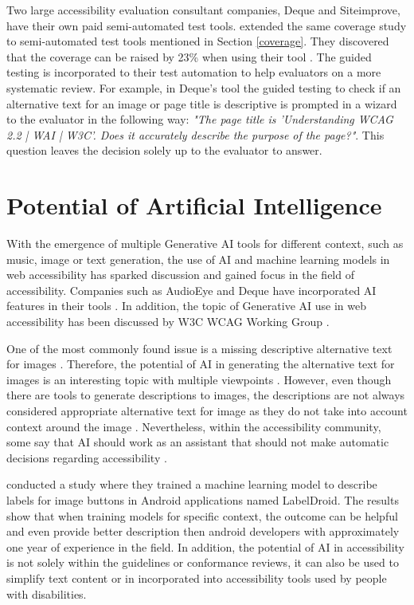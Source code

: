 Two large accessibility evaluation consultant companies, Deque and Siteimprove, have their own paid semi-automated test tools. \textcite{dequecoverage_semi} extended the same coverage study to semi-automated test tools mentioned in Section \ref{coverage}. They discovered that the coverage can be raised by 23\% when using their tool \citep{dequecoverage_semi}. The guided testing is incorporated to their test automation to help evaluators on a more systematic review. For example, in Deque's tool the guided testing to check if an alternative text for an image or page title is descriptive is prompted in a wizard to the evaluator in the following way: \textit{"The page title is 'Understanding WCAG 2.2 | WAI | W3C'. Does it accurately describe the purpose of the page?"}. This question leaves the decision solely up to the evaluator to answer.


\section{Potential of Artificial Intelligence}

With the emergence of multiple Generative AI tools for different context, such as music, image or text generation, the use of AI and machine learning models in web accessibility has sparked discussion and gained focus in the field of accessibility. Companies such as AudioEye and Deque have incorporated AI features in their tools \citep{deque_igt, boia_improve_accessibility}. In addition, the topic of Generative AI use in web accessibility has been discussed by W3C WCAG Working Group \citep{ai_wcag_email}. 

One of the most commonly found issue is a missing descriptive alternative text for images \citep{webaimmillions, dequecoverage}. Therefore, the potential of AI in generating the alternative text for images is an interesting topic with multiple viewpoints \citep{ai_wcag_email, boia_alt_text, potential_for_ai}. However, even though there are tools to generate descriptions to images, the descriptions are not always considered appropriate alternative text for image as they do not take into account context around the image \citep{accessibility_and_ai, boia_alt_text}. Nevertheless, within the accessibility community, some say that AI should work as an assistant that should not make automatic decisions regarding accessibility \citep{ai_wcag_email, accessibility_and_ai}.

\textcite{chen2020unblind} conducted a study where they trained a machine learning model to describe labels for image buttons in Android applications named LabelDroid. The results show that when training models for specific context, the outcome can be helpful and even provide better description then android developers with approximately one year of experience in the field. In addition, the potential of AI in accessibility is not solely within the guidelines or conformance reviews, it can also be used to simplify text content or in incorporated into accessibility tools used by people with disabilities.

